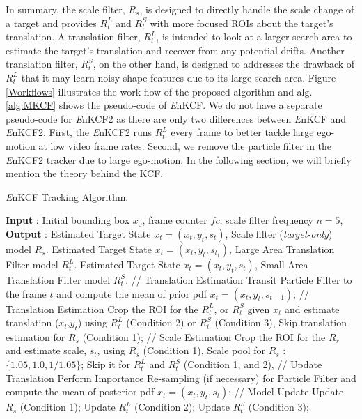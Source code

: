 \documentclass{bmvc2k}
\begin{document}
In summary, the scale filter, $R_{s}$, is designed to directly handle
the scale change of a target and provides $R_{t}^{L}$ and $R_{t}^{S}$
with more focused ROIs about the target's translation. A translation
filter, $R_{t}^{L}$, is intended to look at a larger search area to
estimate the target's translation and recover from any potential
drifts. Another translation filter, $R_{t}^{S}$, on the other hand, is
designed to addresses the drawback of $R_{t}^{L}$ that it may learn
noisy shape features due to its large search area. Figure
\ref{Workflows} illustrates the work-flow of the proposed algorithm
and alg.\ref{alg:MKCF} shows the pseudo-code of {\it E}nKCF. We do not
have a separate pseudo-code for {\it E}nKCF2 as there are only two
differences between {\it E}nKCF and {\it E}nKCF2. First, the {\it
  E}nKCF2 runs $R_{t}^{L}$ every frame to better tackle large
ego-motion at low video frame rates. Second, we remove the particle
filter in the {\it E}nKCF2 tracker due to large ego-motion. In the
following section, we will briefly mention the theory behind the KCF.
\begin{algorithm}[h]
\small
	\caption{{\it E}nKCF Tracking Algorithm.}\label{alg:MKCF}
	\begin{algorithmic}[1]
	\State \textbf{Input} : Initial bounding box $x_{0}$, frame counter $fc$, scale filter frequency $n = 5$,
	\State \textbf{Output} : 
				 
						\State Estimated Target State $x_{t} = (x_{t},y_{t},s_{t})$,
						Scale filter (\textit{target-only}) model $R_{s}$.
			     \EndIf
						\State Estimated Target State $x_{t} = (x_{t},y_{t},s_{t_1})$,
						Large Area Translation Filter model $R_{t}^{L}$.
				\EndIf
						\State Estimated Target State $x_{t} = (x_{t},y_{t},s_{t})$,
						Small Area Translation Filter model $R_{t}^{S}$.
				\EndIf
				\State // Translation Estimation
				\State Transit Particle Filter to the frame $t$ and compute the mean of prior pdf $x_{t} = (x_{t},y_{t},s_{t-1})$;
				\State // Translation Estimation
				\State Crop the ROI for the $R_{t}^{L}$, or $R_{t}^{S}$ given $x_{t}$
				and estimate translation ($x_{t}$,$y_{t}$) using $R_{t}^{L}$ (Condition 2) or $R_{t}^{S}$ (Condition 3),
				\State Skip translation estimation for $R_{s}$ (Condition 1);
				\State // Scale Estimation
			    \State Crop the ROI for the $R_{s}$ and estimate scale, $s_{t}$, using $R_{s}$ (Condition 1), 
				\State Scale pool for $R_{s}$ : $\lbrace1.05,1.0,1/1.05\rbrace$;
		        \State Skip it for $R_{t}^{L}$ and $R_{t}^{S}$ (Condition 1, and 2),
				\State // Update Translation
				\State Perform Importance Re-sampling (if necessary) for Particle Filter and compute the mean of posterior pdf $x_{t} = (x_{t},y_{t},s_{t})$;
			    \State // Model Update
			    \State Update $R_{s}$ (Condition 1);
			    \State Update $R_{t}^{L}$ (Condition 2);
				\State Update $R_{t}^{S}$ (Condition 3);
			     \EndIf		
	\EndProcedure	
	\end{algorithmic}
\end{algorithm}
\end{document}
